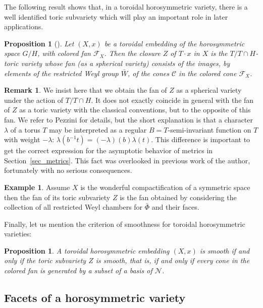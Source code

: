 \documentclass{amsart}
\newtheorem{prop}[thm]{Proposition}
\theoremstyle{definition}
\newtheorem{rem}[thm]{Remark}
\newtheorem{exa}[thm]{Example}
\begin{document}
The following result shows that, in a toroidal horosymmetric 
variety, there is a well identified toric subvariety which 
will play an important role in later applications.

\begin{prop}[{\cite[Corollary 8.3 and paragraph after Corollary 6.3]{Kno94}}]
\label{prop_toric_subvar}
Let $(X,x)$ be a toroidal embedding of the horosymmetric space $G/H$, 
with colored fan $\mathcal{F}_X$.  
Then the closure $Z$ of $T\cdot x$ in $X$ is the $T/T\cap H$-toric 
variety whose fan (as a spherical variety) 
consists of the images, by elements of the restricted Weyl group $\bar{W}$, 
of the cones $\mathcal{C}$ in the colored cone $\mathcal{F}_X$.
\end{prop}

\begin{rem}
We insist here that we obtain the fan of $Z$ as a spherical variety 
under the action of $T/T\cap H$. It does not exactly coincide in 
general with the fan of $Z$ as a toric variety with the classical conventions, 
but to the opposite of this fan. We refer to Pezzini \cite[Section 2]{Pez10}
for details, but the short explanation is that a character $\lambda$
of a torus $T$ may be interpreted as a regular $B=T$-semi-invariant 
function on $T$ with weight $-\lambda$:
$\lambda(b^{-1}t)=(-\lambda)(b)\lambda(t)$.
This difference is important to get the correct expression for the 
asymptotic behavior of metrics in Section~\ref{sec_metrics}. 
This fact was overlooked in previous work of the author, 
fortunately with no serious consequences. 
\end{rem}

\begin{exa}
Assume $X$ is the wonderful compactification of a symmetric space 
then the fan of its toric subvariety $Z$ is the fan obtained by considering 
the collection of all restricted Weyl chambers for $\bar{\Phi}$ and their 
faces.  
\end{exa}

Finally, let us mention the 
criterion of smoothness for toroidal horosymmetric varieties:
\begin{prop}
\label{prop_smoothness}
A toroidal horosymmetric embedding $(X,x)$ is smooth if and only if the 
toric subvariety $Z$ is smooth, that is, if and only if every cone in the 
colored fan is generated by a subset of a basis of $\mathcal{N}$.  
\end{prop}

\subsection{Facets of a horosymmetric variety}
\end{document}
